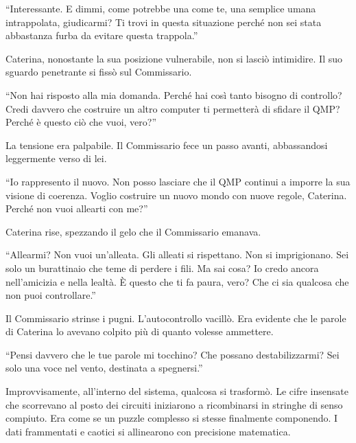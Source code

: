 \begin{dialogue}  \enquote{Interessante. E dimmi, come potrebbe una come te, una semplice umana intrappolata, giudicarmi? Ti trovi in questa situazione perché non sei stata abbastanza furba da evitare questa trappola.} \end{dialogue}

Caterina, nonostante la sua posizione vulnerabile, non si lasciò intimidire. Il suo sguardo penetrante si fissò sul Commissario.

\begin{dialogue}  \enquote{Non hai risposto alla mia domanda. Perché hai così tanto bisogno di controllo? Credi davvero che costruire un altro computer ti permetterà di sfidare il QMP? Perché è questo ciò che vuoi, vero?} \end{dialogue}

La tensione era palpabile. Il Commissario fece un passo avanti, abbassandosi leggermente verso di lei.

\begin{dialogue}  \enquote{Io rappresento il nuovo. Non posso lasciare che il QMP continui a imporre la sua visione di coerenza. Voglio costruire un nuovo mondo con nuove regole, Caterina. Perché non vuoi allearti con me?} \end{dialogue}

Caterina rise, spezzando il gelo che il Commissario emanava.

\begin{dialogue}  \enquote{Allearmi? Non vuoi un'alleata. Gli alleati si rispettano. Non si imprigionano. Sei solo un burattinaio che teme di perdere i fili. Ma sai cosa? Io credo ancora nell'amicizia e nella lealtà. È questo che ti fa paura, vero? Che ci sia qualcosa che non puoi controllare.} \end{dialogue}

Il Commissario strinse i pugni. L'autocontrollo vacillò. Era evidente che le parole di Caterina lo avevano colpito più di quanto volesse ammettere.

\begin{dialogue}  \enquote{Pensi davvero che le tue parole mi tocchino? Che possano destabilizzarmi? Sei solo una voce nel vento, destinata a spegnersi.} \end{dialogue}


Improvvisamente, all'interno del sistema, qualcosa si trasformò. Le cifre insensate che scorrevano al posto dei circuiti iniziarono a ricombinarsi in stringhe di senso compiuto. Era come se un puzzle complesso si stesse finalmente componendo. I dati frammentati e caotici si allinearono con precisione matematica.


